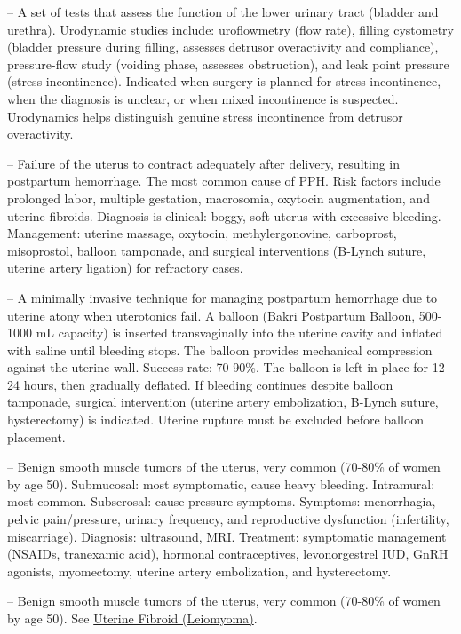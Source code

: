-- A set of tests that assess the function of the lower urinary tract (bladder and urethra). Urodynamic studies include: uroflowmetry (flow rate), filling cystometry (bladder pressure during filling, assesses detrusor overactivity and compliance), pressure-flow study (voiding phase, assesses obstruction), and leak point pressure (stress incontinence). Indicated when surgery is planned for stress incontinence, when the diagnosis is unclear, or when mixed incontinence is suspected. Urodynamics helps distinguish genuine stress incontinence from detrusor overactivity.

-- Failure of the uterus to contract adequately after delivery, resulting in postpartum hemorrhage. The most common cause of PPH. Risk factors include prolonged labor, multiple gestation, macrosomia, oxytocin augmentation, and uterine fibroids. Diagnosis is clinical: boggy, soft uterus with excessive bleeding. Management: uterine massage, oxytocin, methylergonovine, carboprost, misoprostol, balloon tamponade, and surgical interventions (B-Lynch suture, uterine artery ligation) for refractory cases.

-- A minimally invasive technique for managing postpartum hemorrhage due to uterine atony when uterotonics fail. A balloon (Bakri Postpartum Balloon, 500-1000 mL capacity) is inserted transvaginally into the uterine cavity and inflated with saline until bleeding stops. The balloon provides mechanical compression against the uterine wall. Success rate: 70-90\%. The balloon is left in place for 12-24 hours, then gradually deflated. If bleeding continues despite balloon tamponade, surgical intervention (uterine artery embolization, B-Lynch suture, hysterectomy) is indicated. Uterine rupture must be excluded before balloon placement.

-- Benign smooth muscle tumors of the uterus, very common (70-80\% of women by age 50). Submucosal: most symptomatic, cause heavy bleeding. Intramural: most common. Subserosal: cause pressure symptoms. Symptoms: menorrhagia, pelvic pain/pressure, urinary frequency, and reproductive dysfunction (infertility, miscarriage). Diagnosis: ultrasound, MRI. Treatment: symptomatic management (NSAIDs, tranexamic acid), hormonal contraceptives, levonorgestrel IUD, GnRH agonists, myomectomy, uterine artery embolization, and hysterectomy.

-- Benign smooth muscle tumors of the uterus, very common (70-80\% of women by age 50). See \hyperlink{Uterine Fibroid (Leiomyoma)}{Uterine Fibroid (Leiomyoma)}.


